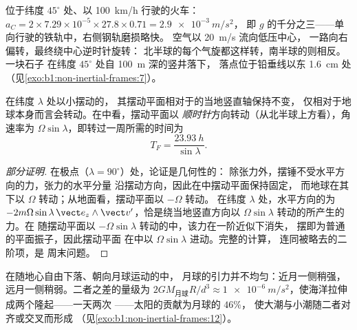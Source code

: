 \begin{example}\label{ex:b1:non-inertial-frames:coriolisnum}
位于纬度 $45^\circ$ 处、以 \qty{100}{km/h} 行驶的火车：$a_C = 2 \times 7.29\times
10^{-5} \times 27.8 \times 0.71 = \qty{2.9e-3}{m/s^2}$，
即 $g$ 的千分之三——单向行驶的铁轨中，右侧钢轨磨损略快。
空气以 \qty{20}{m/s} 流向低压中心，
一路向右偏转，最终绕中心逆时针旋转：
北半球的每个气旋都这样转，南半球的则相反。一块石子
在纬度 $45^\circ$ 处自 \qty{100}{m} 深的竖井落下，
落点位于铅垂线以东 \qty{1.6}{cm} 处（见\cref{exo:b1:non-inertial-frames:7}）。
\end{example}

\begin{proposition}[傅科摆]\label{prop:b1:non-inertial-frames:foucault}
在纬度 $\lambda$ 处以小摆动的，
其摆动平面相对于的当地竖直轴保持不变，
仅相对于地球本身而言会转动。在中看，摆动平面以
\emph{顺时针}方向转动（从北半球上方看），角速率为
$\Omega\sin\lambda$，即转过一周所需的时间为
\[
T_F = \frac{\qty{23.93}{h}}{\sin\lambda} .
\]
\end{proposition}

\begin{proof}[部分证明]
在极点（$\lambda = 90^\circ$）处，论证是几何性的：
除张力外，摆锤不受水平方向的力，张力的水平分量
沿摆动方向，因此在中摆动平面保持固定，
而地球在其下以 $\Omega$ 转动；从地面看，摆动平面以 $-\Omega$ 转动。
在纬度 $\lambda$ 处，水平方向的为
$-2m\Omega\sin\lambda\,\vect e_z\wedge\vect v'$，恰是绕当地竖直方向以
$\Omega\sin\lambda$ 转动的所产生的力。在
随摆动平面以 $-\Omega\sin\lambda$ 转动的中，该力在一阶近似下消失，
摆即为普通的平面振子，因此摆动平面
在中以 $\Omega\sin\lambda$ 进动。完整的计算，
连同被略去的二阶项，是
周末问题。
\end{proof}

\begin{remark}[两句话说清潮汐]\label{rem:b1:non-inertial-frames:tides}
在随地心自由下落、朝向月球运动的中，
月球的引力并不均匀：近月一侧稍强，
远月一侧稍弱。二者之差的量级为 $2GM_{\text{月球}}R/d^3
\approx \qty{1e-6}{m/s^2}$，使海洋拉伸成两个隆起——一天两次
——太阳的贡献为月球的 $46\%$，
使大潮与小潮随二者对齐或交叉而形成
（见\cref{exo:b1:non-inertial-frames:12}）。
\end{remark}

